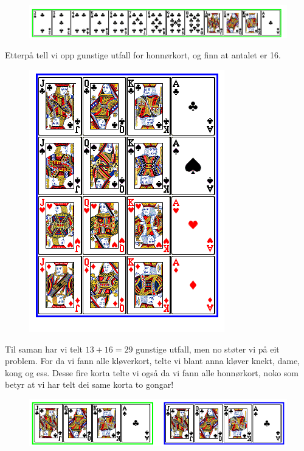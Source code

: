 \qquad
{}
	
	\begin{figure}[H]
		\centering
		\includegraphics[scale=0.45]{kort1}
	\end{figure}
	Etterpå tell vi opp gunstige utfall for honnørkort, og finn at antalet er 16. \\
	\begin{figure}[H]
		\centering
		\includegraphics[scale=0.45]{kort2}
	\end{figure}
Til saman har vi telt ${13+16=29}$ gunstige utfall, men no støter vi på eit problem. For da vi fann alle kløverkort, telte vi blant anna kløver knekt, dame, kong og ess. Desse fire korta telte vi også da vi fann alle honnørkort, noko som betyr at vi har telt dei same korta to gongar! \\
	\begin{figure}[H]
		\centering
		\includegraphics[scale=0.45]{kort4}
	\end{figure}
